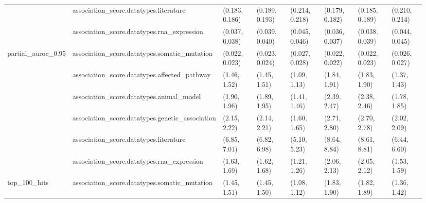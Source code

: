 \begin{table}[H]
{\begin{tabular}{llllllll}
 & association\_score.datatypes.literature & (0.183, 0.186) & (0.189, 0.193) & (0.214, 0.218) & (0.179, 0.182) & (0.185, 0.189) & (0.210, 0.214)\\

 & association\_score.datatypes.rna\_expression & (0.037, 0.038) & (0.039, 0.040) & (0.045, 0.046) & (0.036, 0.037) & (0.038, 0.039) & (0.044, 0.045)\\

\multirow{-6}{*}{\raggedright\arraybackslash partial\_auroc\_0.95} & association\_score.datatypes.somatic\_mutation & (0.022, 0.023) & (0.023, 0.024) & (0.027, 0.028) & (0.022, 0.022) & (0.022, 0.023) & (0.026, 0.027)\\
\cmidrule{1-8}
 & association\_score.datatypes.affected\_pathway & (1.46, 1.52) & (1.45, 1.51) & (1.09, 1.13) & (1.84, 1.91) & (1.83, 1.90) & (1.37, 1.43)\\

 & association\_score.datatypes.animal\_model & (1.90, 1.96) & (1.89, 1.95) & (1.41, 1.46) & (2.39, 2.47) & (2.38, 2.46) & (1.78, 1.85)\\

 & association\_score.datatypes.genetic\_association & (2.15, 2.22) & (2.14, 2.21) & (1.60, 1.65) & (2.71, 2.80) & (2.70, 2.78) & (2.02, 2.09)\\

 & association\_score.datatypes.literature & (6.85, 7.01) & (6.82, 6.98) & (5.10, 5.23) & (8.64, 8.84) & (8.61, 8.81) & (6.44, 6.60)\\

 & association\_score.datatypes.rna\_expression & (1.63, 1.69) & (1.62, 1.68) & (1.21, 1.26) & (2.06, 2.13) & (2.05, 2.12) & (1.53, 1.59)\\

\multirow{-6}{*}{\raggedright\arraybackslash top\_100\_hits} & association\_score.datatypes.somatic\_mutation & (1.45, 1.51) & (1.45, 1.50) & (1.08, 1.12) & (1.83, 1.90) & (1.82, 1.89) & (1.36, 1.42)\\
\bottomrule
\end{tabular}}
\end{table}
